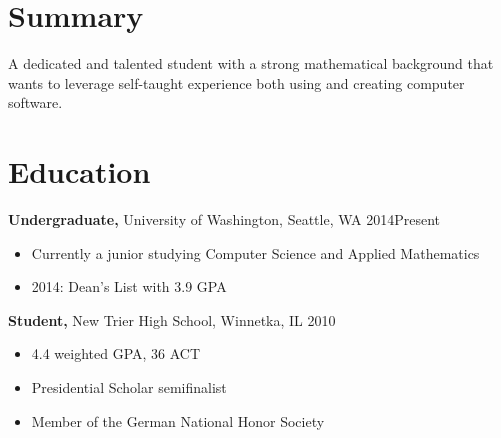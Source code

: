 \documentclass[margin]{res}
\begin{document}
\address{
  {\bf Present Address} \\ 4000 NE 15th Avenue \\ Seattle, WA 98195 \\
  {\bf Permanent Address} \\ 1310 Maple Avenue \\ Wilmette, IL 60091 }
\address{
  {\bf Contact Information} \\ dangeloandrew@outlook.com \\ +1 (847) 906-3448 \\
  {\bf GitHub Profile} \\ http://github.com/excelangue }

\begin{resume}

\section{Summary}
A dedicated and talented student with a strong mathematical background that wants to leverage self-taught experience both using and creating computer software.

\section{Education}

{\bf Undergraduate,} University of Washington, Seattle, WA \hfill 2014\textendash Present
\begin{itemize} \itemsep -2pt  %
\item Currently a junior studying Computer Science and Applied Mathematics
\item 2014: Dean's List with 3.9 GPA
\end{itemize}

{\bf Student,}  New Trier High School, Winnetka, IL \hfill 2010
\begin{itemize} \itemsep -2pt  %
\item 4.4 weighted GPA, 36 ACT
\item Presidential Scholar semifinalist
\item Member of the German National Honor Society
\end{itemize}


\end{resume}
\end{document}
